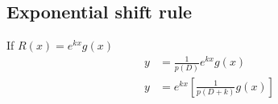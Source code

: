 \documentclass[oneside,11pt,pdftex,final]{book}%
\numberwithin{equation}{section}
\newtheorem{example}[theorem]{Example}
\numberwithin{section}{chapter}
\numberwithin{equation}{chapter}
\begin{document}
\subsection{Exponential shift rule}
If $ R(x)=e^{kx}g(x) $
\begin{align*}
	y&= \frac{1}{p(D)}e^{kx}g(x)\\
	y&=e^{kx}\left[\frac{1}{p(D+k)}g(x)\right]
\end{align*}

%
%
\end{document}
